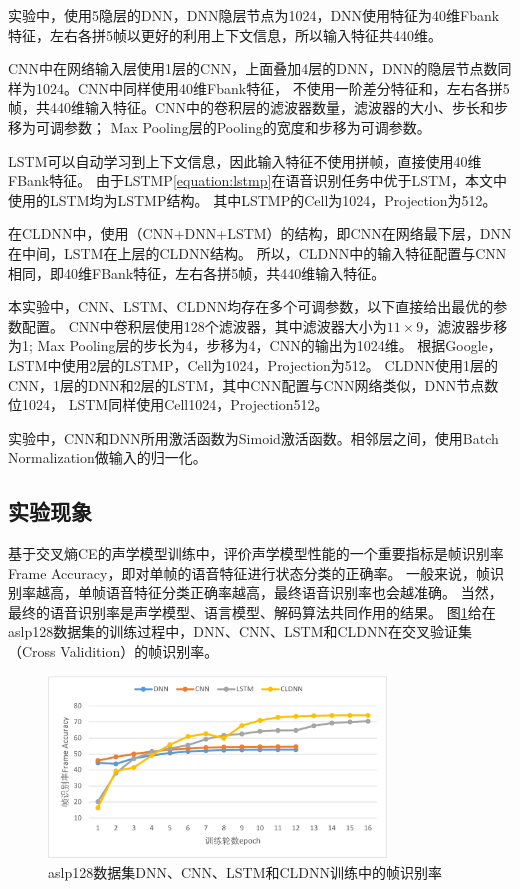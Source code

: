 实验中，使用5隐层的DNN，DNN隐层节点为1024，DNN使用特征为40维Fbank特征，左右各拼5帧以更好的利用上下文信息，所以输入特征共440维。

CNN中在网络输入层使用1层的CNN，上面叠加4层的DNN，DNN的隐层节点数同样为1024。CNN中同样使用40维Fbank特征，
不使用一阶差分特征和，左右各拼5帧，共440维输入特征。CNN中的卷积层的滤波器数量，滤波器的大小、步长和步移为可调参数；
Max Pooling层的Pooling的宽度和步移为可调参数。

LSTM可以自动学习到上下文信息，因此输入特征不使用拼帧，直接使用40维FBank特征。
由于LSTMP\ref{equation:lstmp}在语音识别任务中优于LSTM，本文中使用的LSTM均为LSTMP结构。
其中LSTMP的Cell为1024，Projection为512。

在CLDNN中，使用（CNN+DNN+LSTM）的结构，即CNN在网络最下层，DNN在中间，LSTM在上层的CLDNN结构。
所以，CLDNN中的输入特征配置与CNN相同，即40维FBank特征，左右各拼5帧，共440维输入特征。

本实验中，CNN、LSTM、CLDNN均存在多个可调参数，以下直接给出最优的参数配置。
CNN中卷积层使用128个滤波器，其中滤波器大小为$11×9$，滤波器步移为1;
Max Pooling层的步长为4，步移为4，CNN的输出为1024维。
根据Google，LSTM中使用2层的LSTMP，Cell为1024，Projection为512。
CLDNN使用1层的CNN，1层的DNN和2层的LSTM，其中CNN配置与CNN网络类似，DNN节点数位1024，
LSTM同样使用Cell1024，Projection512。

实验中，CNN和DNN所用激活函数为Simoid激活函数。相邻层之间，使用Batch Normalization做输入的归一化。

\subsection{实验现象}

基于交叉熵CE的声学模型训练中，评价声学模型性能的一个重要指标是帧识别率Frame Accuracy，即对单帧的语音特征进行状态分类的正确率。
一般来说，帧识别率越高，单帧语音特征分类正确率越高，最终语音识别率也会越准确。
当然，最终的语音识别率是声学模型、语言模型、解码算法共同作用的结果。
图\ref{fig:acc}给在aslp128数据集的训练过程中，DNN、CNN、LSTM和CLDNN在交叉验证集（Cross Validition）的帧识别率。

\begin{figure}[htbp]
\centering
\includegraphics[width=0.8\textwidth]{figures/chapter3/acc-crop}
\caption{aslp128数据集DNN、CNN、LSTM和CLDNN训练中的帧识别率}
\label{fig:acc}
\end{figure}

